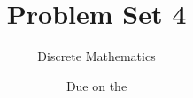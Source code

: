




\title{Problem Set 4}
\author[Daniel Gonzalez Cedre]{Discrete Mathematics}
\date{Due on the }



\maketitle

\begin{enumerate}


\end{enumerate}
